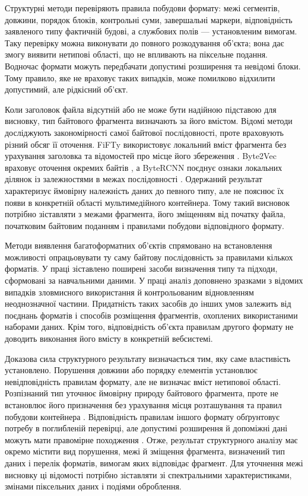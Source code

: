 Структурні методи перевіряють правила побудови формату: межі сегментів, довжини, порядок блоків, контрольні суми, завершальні маркери, відповідність заявленого типу фактичній будові, а службових полів --- установленим вимогам. Таку перевірку можна виконувати до повного розкодування об’єкта; вона дає змогу виявити нетипові області, що не впливають на піксельне подання. Водночас формати можуть передбачати допустимі розширення та невідомі блоки. Тому правило, яке не враховує таких випадків, може помилково відхилити допустимий, але рідкісний об’єкт.

Коли заголовок файла відсутній або не може бути надійною підставою для висновку, тип байтового фрагмента визначають за його вмістом. Відомі методи досліджують закономірності самої байтової послідовності, проте враховують різний обсяг її оточення. FiFTy використовує локальний вміст фрагмента без урахування заголовка та відомостей про місце його збереження \cite{mittal2021fifty}. Byte2Vec враховує оточення окремих байтів \cite{haque2022byteembeddings}, а ByteRCNN поєднує ознаки локальних ділянок із залежностями в межах послідовності \cite{skracic2023bytercnn}. Одержаний результат характеризує ймовірну належність даних до певного типу, але не пояснює їх появи в конкретній області мультимедійного контейнера. Тому такий висновок потрібно зіставляти з межами фрагмента, його зміщенням від початку файла, початковим байтовим поданням і правилами побудови відповідного формату.

Методи виявлення багатоформатних об’єктів спрямовано на встановлення можливості опрацьовувати ту саму байтову послідовність за правилами кількох форматів. У праці \cite{koch2022polyglot} зіставлено поширені засоби визначення типу та підходи, сформовані за навчальними даними. У праці \cite{koch2025polyglot} аналіз доповнено зразками з відомих випадків зловмисного використання й контрольованим відновленням неоднозначної частини. Придатність таких засобів до інших умов залежить від поєднань форматів і способів розміщення фрагментів, охоплених використаними наборами даних. Крім того, відповідність об’єкта правилам другого формату не доводить виконання його вмісту в конкретній вебсистемі.

Доказова сила структурного результату визначається тим, яку саме властивість установлено. Порушення довжини або порядку елементів установлює невідповідність правилам формату, але не визначає вміст нетипової області. Розпізнаний тип уточнює ймовірну природу байтового фрагмента, проте не встановлює його призначення без урахування місця розташування та правил побудови контейнера \cite{mittal2021fifty,haque2022byteembeddings,skracic2023bytercnn}. Відповідність правилам іншого формату обґрунтовує потребу в поглибленій перевірці, але допустимі розширення й допоміжні дані можуть мати правомірне походження \cite{koch2022polyglot,koch2025polyglot}. Отже, результат структурного аналізу має окремо містити вид порушення, межі й зміщення фрагмента, визначений тип даних і перелік форматів, вимогам яких відповідає фрагмент. Для уточнення межі висновку ці відомості потрібно зіставляти зі спектральними характеристиками, змінами піксельних даних і подіями оброблення.


